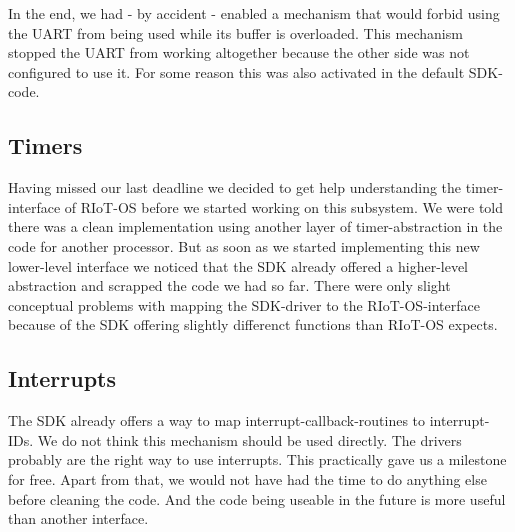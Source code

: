 In the end, we had - by accident - enabled a mechanism that would forbid using the UART
from being used while its buffer is overloaded. This mechanism stopped the UART from
working altogether because the other side was not configured to use it.
For some reason this was also activated in the default SDK-code.

\subsection{Timers}
Having missed our last deadline we decided to get help understanding the timer-interface
of RIoT-OS before we started working on this subsystem. We were told there was a clean
implementation using another layer of timer-abstraction in the code for another
processor.
But as soon as we started implementing this new lower-level interface we noticed that the
SDK already offered a higher-level abstraction and scrapped the code we had so far.
There were only slight conceptual problems with mapping the SDK-driver to the
RIoT-OS-interface because of the SDK offering slightly differenct functions than RIoT-OS
expects.

\subsection{Interrupts}

The SDK already offers a way to map interrupt-callback-routines to interrupt-IDs.
We do not think this mechanism should be used directly. The drivers probably are the
right way to use interrupts.
This practically gave us a milestone for free. Apart from that, we would not have had the
time to do anything else before cleaning the code.
And the code being useable in the future is more useful than another interface.
